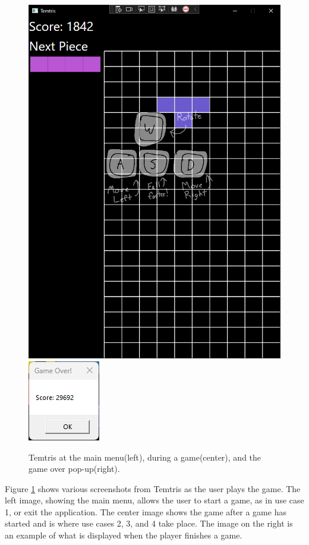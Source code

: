\documentclass[10pt,conference,onecolumn,compsoc]{IEEEtran}
\begin{document}
\begin{figure}[!h]
\includegraphics[scale=0.3]{Temtris_Game.png}
\includegraphics[scale=.8]{Temtris_GameOver.png}
\caption{Temtris at the main menu(left), during a game(center), and the game over pop-up(right).}
\label{fig:uimockups}
\end{figure}

Figure \ref{fig:uimockups} shows various screenshots from Temtris as the user plays the game. The left image, showing the main menu, allows the user to start a game, as in use case 1, or exit the application. The center image shows the game after a game has started and is where use cases 2, 3, and 4 take place. The image on the right is an example of what is displayed when the player finishes a game.
\end{document}
